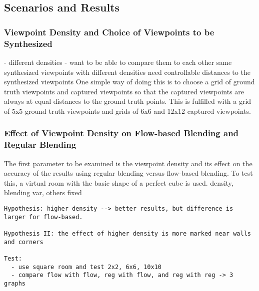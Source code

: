 \subsection{Scenarios and Results}

\subsubsection{Viewpoint Density and Choice of Viewpoints to be Synthesized}
- different densities
- want to be able to compare them to each other \ar same synthesized viewpoints with different densities \ar need controllable distances to the synthesized viewpoints
One simple way of doing this is to choose a grid of ground truth viewpoints and captured viewpoints so that the captured viewpoints are always at equal distances to the ground truth points. This is fulfilled with a grid of 5x5 ground truth viewpoints and grids of 6x6 and 12x12 captured viewpoints.

%
%
%
%

\subsubsection{Effect of Viewpoint Density on Flow-based Blending and Regular Blending}
The first parameter to be examined is the viewpoint density and its effect on the accuracy of the results using regular blending versus flow-based blending. To test this, a virtual room with the basic shape of a perfect cube is used. 
density, blending var, others fixed
\begin{verbatim}
Hypothesis: higher density --> better results, but difference is larger for flow-based.

Hypothesis II: the effect of higher density is more marked near walls and corners

Test:
  - use square room and test 2x2, 6x6, 10x10
  - compare flow with flow, reg with flow, and reg with reg -> 3 graphs

\end{verbatim}


